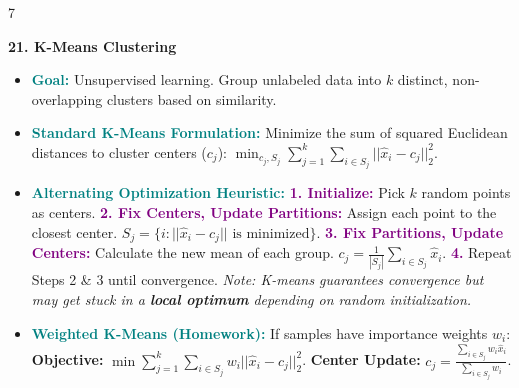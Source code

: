 \documentclass{article}
\newcommand{\hlhighlight}[1]{\par\vspace{1.5pt}\noindent\colorbox{yellow!50}{\parbox{\dimexpr\columnwidth-2\fboxsep\relax}{\textbf{#1}}}\par\vspace{0.5pt}}
\newcommand{\sectitle}[1]{\par\textbf{\color{blue!70!black}{#1}}\par}
\newcommand{\concept}[1]{\textcolor{teal}{\textbf{#1}}}
\newcommand{\procname}[1]{\textcolor{purple}{\textbf{#1}}}
\newcommand{\lbl}[1]{\textcolor{green!60!black}{\textbf{#1}}}
\begin{document}
\begin{multicols}{7}
\hlhighlight{21. K-Means Clustering}
\sectitle{Formulations \& Heuristics}
\begin{itemize}
    \item \concept{Goal:} Unsupervised learning. Group unlabeled data into $k$ distinct, non-overlapping clusters based on similarity.
    \item \concept{Standard K-Means Formulation:} Minimize the sum of squared Euclidean distances to cluster centers ($c_j$): $\min_{c_j, S_j} \sum_{j=1}^k \sum_{i \in S_j} ||\hat{x}_i - c_j||_2^2$.
    \item \concept{Alternating Optimization Heuristic:} \procname{1. Initialize:} Pick $k$ random points as centers. \procname{2. Fix Centers, Update Partitions:} Assign each point to the closest center. $S_j = \{ i : ||\hat{x}_i - c_j|| \text{ is minimized} \}$. \procname{3. Fix Partitions, Update Centers:} Calculate the new mean of each group. $c_j = \frac{1}{|S_j|} \sum_{i \in S_j} \hat{x}_i$. \procname{4.} Repeat Steps 2 \& 3 until convergence. \textit{Note: K-means guarantees convergence but may get stuck in a \lbl{local optimum} depending on random initialization.}
    \item \concept{Weighted K-Means (Homework):} If samples have importance weights $w_i$: \lbl{Objective:} $\min \sum_{j=1}^k \sum_{i \in S_j} w_i ||\hat{x}_i - c_j||_2^2$. \lbl{Center Update:} $c_j = \frac{\sum_{i \in S_j} w_i \hat{x}_i}{\sum_{i \in S_j} w_i}$.
\end{itemize}


\end{multicols}
\end{document}
